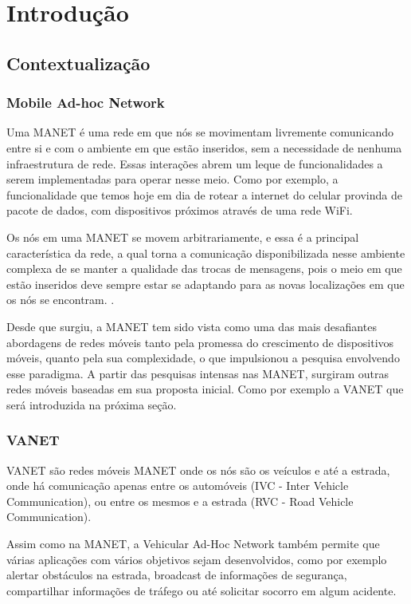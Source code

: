 \documentclass[12pt, %
openright, 
oneside,
a4paper,
brazil]{facom-ufu-abntex2}
\begin{document}
\chapter{Introdução}
\section{Contextualização}
\subsection{Mobile Ad-hoc Network}
Uma \ac{MANET} é uma rede em que nós se movimentam livremente comunicando entre si e com o ambiente em que estão inseridos, sem a necessidade de nenhuma infraestrutura de rede. Essas interações abrem um leque de funcionalidades a serem implementadas para operar nesse meio. Como por exemplo, a funcionalidade que temos hoje em dia de rotear a internet do celular provinda de pacote de dados, com dispositivos próximos através de uma rede \ac{WiFi}.

Os nós em uma \ac{MANET} se movem arbitrariamente, e essa é a principal característica da rede, a qual torna a comunicação disponibilizada nesse ambiente complexa de se manter a qualidade das trocas de mensagens, pois o meio em que estão inseridos deve sempre estar se adaptando para as novas localizações em que os nós se encontram. \cite{de2002mobile}.

Desde que surgiu, a \ac{MANET} tem sido vista como uma das mais desafiantes abordagens de redes móveis tanto pela promessa do crescimento de dispositivos móveis, quanto pela sua complexidade, o que impulsionou a pesquisa envolvendo esse paradigma. A partir das pesquisas intensas nas \ac{MANET}, surgiram outras redes móveis baseadas em sua proposta inicial. Como por exemplo a \ac{VANET} que será introduzida na próxima seção.



\subsection{VANET}
\ac{VANET} são redes móveis \ac{MANET} onde os nós são os veículos e até a estrada, onde há comunicação apenas entre os automóveis (IVC - Inter Vehicle Communication), ou entre os mesmos e a estrada (RVC - Road Vehicle Communication). \cite{ufrj-Vanet}

Assim como na MANET, a Vehicular Ad-Hoc Network também permite que várias aplicações com vários objetivos sejam desenvolvidos, como por exemplo alertar obstáculos na estrada, broadcast de informações de segurança, compartilhar informações de tráfego ou até solicitar socorro em algum acidente.
\end{document}
